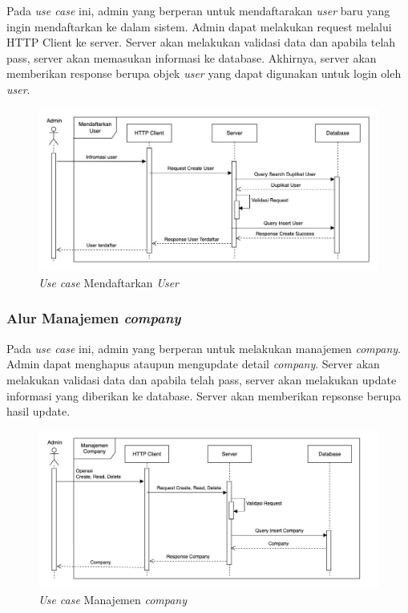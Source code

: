 Pada \textit{use case} ini, admin yang berperan untuk mendaftarakan \textit{user} baru yang ingin mendaftarkan ke dalam sistem. Admin dapat melakukan request melalui HTTP Client ke server. Server akan melakukan validasi data dan apabila telah pass, server akan memasukan informasi ke database. Akhirnya, server akan memberikan response berupa objek \textit{user} yang dapat digunakan untuk login oleh \textit{user}.

\begin{figure}[ht]
  \centering
  \includegraphics[width=1\textwidth]{resources/chapter-3/usecase/uc-02.jpg}
  \caption{\textit{Use case} Mendaftarkan \textit{User}}
  \label{fig:usecase-02}
\end{figure}

\subsubsection{Alur Manajemen \textit{company}}

Pada \textit{use case} ini, admin yang berperan untuk melakukan manajemen \textit{company}. Admin dapat menghapus ataupun mengupdate detail \textit{company}. Server akan melakukan validasi data dan apabila telah pass, server akan melakukan update informasi yang diberikan ke database. Server akan memberikan repsonse berupa hasil update.

\begin{figure}
  \centering
  \includegraphics[width=1\textwidth]{resources/chapter-3/usecase/uc-03.jpg}
  \caption{\textit{Use case} Manajemen \textit{company}}
  \label{fig:usecase-03}
\end{figure}

